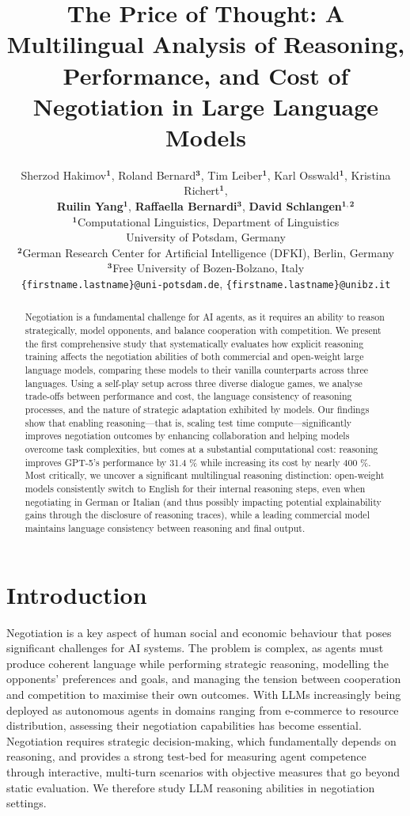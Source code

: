 \documentclass[11pt]{article}
\title{The Price of Thought: A Multilingual Analysis of Reasoning, Performance, and Cost of Negotiation in Large Language Models}
\author{%
Sherzod Hakimov${^\mathbf{1}}$, 
Roland Bernard${^\mathbf{3}}$, 
Tim Leiber${^\mathbf{1}}$,
Karl Osswald${^\mathbf{1}}$,
Kristina Richert${^\mathbf{1}}$,\\
\textbf{Ruilin Yang}${^\mathbf{1}}$,
\textbf{Raffaella Bernardi}${^\mathbf{3}}$,
\textbf{David Schlangen}${^\mathbf{1,2}}$\\$^{\mathbf{1}}$Computational Linguistics, Department of Linguistics\\
University of Potsdam, Germany\\
$^{\mathbf{2}}$German Research Center for Artificial Intelligence (DFKI), Berlin, Germany\\
$^{\mathbf{3}}$Free University of Bozen-Bolzano, Italy\\
{\texttt{\{firstname.lastname\}@uni-potsdam.de}}, 
{\texttt{\{firstname.lastname\}@unibz.it}}
}
\begin{document}
\maketitle
\begin{abstract}
Negotiation is a fundamental challenge for AI agents, as it requires an ability to reason strategically, model opponents, and balance cooperation with competition. We present the first comprehensive study that systematically evaluates how explicit reasoning training affects the negotiation abilities of both commercial and open-weight large language models, comparing these models to their vanilla counterparts across three languages. Using a self-play setup across three diverse dialogue games, we analyse trade-offs between performance and cost, the language consistency of reasoning processes, and the nature of strategic adaptation exhibited by models.
Our findings show that enabling reasoning---that is, scaling test time compute---significantly improves negotiation outcomes by enhancing collaboration and helping models overcome task complexities, but comes at a substantial computational cost: reasoning improves GPT-5's performance by 31.4 \% while increasing its cost by nearly 400 \%. Most critically, we uncover a significant multilingual reasoning distinction: open-weight models consistently switch to English for their internal reasoning steps, even when negotiating in German or Italian (and thus possibly impacting potential explainability gains through the disclosure of reasoning traces), while a leading commercial model maintains language consistency between reasoning and final output.
\end{abstract}

\section{Introduction}

Negotiation is a key aspect of human social and economic behaviour that poses significant challenges for AI systems. The problem is complex, as agents must produce coherent language while performing strategic reasoning, modelling the opponents' preferences and goals, and managing the tension between cooperation and competition to maximise their own outcomes. 
With LLMs increasingly being deployed as autonomous agents in domains ranging from e-commerce to resource distribution, assessing their negotiation capabilities has become essential. Negotiation requires strategic decision-making, which fundamentally depends on reasoning, and provides a strong test-bed for measuring agent competence through interactive, multi-turn scenarios with objective measures that go beyond static evaluation. We therefore study LLM reasoning abilities in negotiation settings.
\end{document}
